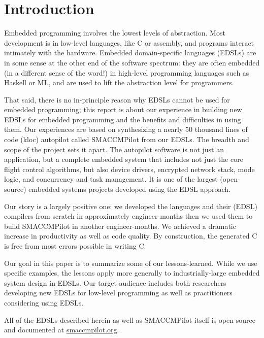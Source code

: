 \section{Introduction}

Embedded programming involves the lowest levels of abstraction.  Most development
is in low-level languages, like C or assembly, and programs interact intimately
with the hardware.  Embedded domain-specific languages (EDSLs) are in
some sense at the other end of the software spectrum: they are often embedded
(in a different sense of the word!) in high-level programming languages such as
Haskell or ML, and are used to lift the abstraction level for programmers.

That said, there is no in-principle reason why EDSLs cannot be used for embedded
programming; this report is about our experience in building new EDSLs for
embedded programming and the benefits and difficulties in using them.  Our
experiences are based on synthesizing a nearly 50 thousand lines of code (kloc)
autopilot called SMACCMPilot from our EDSLs.  The breadth and scope of the
project sets it apart.  The autopilot software is not just an application, but a
complete embedded system that includes not just the core flight control
algorithms, but also device drivers, encrypted network stack, mode logic, and
concurrency and task management.  It is one of the largest (open-source)
embedded systems projects developed using the EDSL approach.

Our story is a largely positive one: we developed the languages and their (EDSL)
compilers from scratch in approximately  engineer-months then we used
them to build SMACCMPilot in another  engineer-months.  We achieved a
dramatic increase in productivity as well as code quality.  By construction, the
generated C is free from most errors possible in writing C.

Our goal in this paper is to summarize some of our lessons-learned.  While we
use specific examples, the lessons apply more generally to industrially-large
embedded system design in EDSLs.  Our target audience includes both researchers
developing new EDSLs for low-level programming as well as practitioners
considering using EDSLs.

All of the EDSLs described herein as well as SMACCMPilot itself is open-source
and documented at \url{smaccmpilot.org}.



